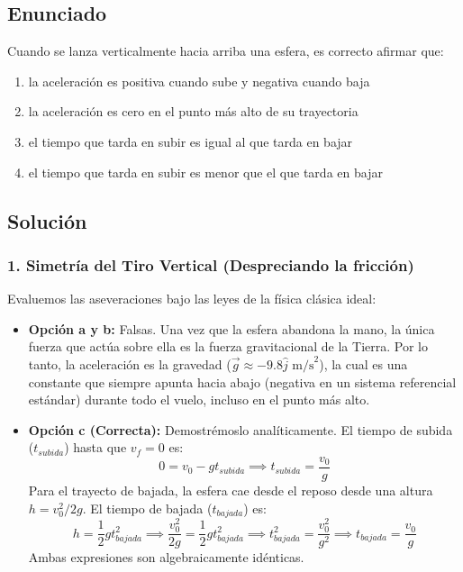 \documentclass[12pt, a4paper]{article}
\begin{document}
\subsection*{Enunciado}
Cuando se lanza verticalmente hacia arriba una esfera, es correcto afirmar que:
\begin{enumerate}[label=\alph*)]
    \item la aceleración es positiva cuando sube y negativa cuando baja
    \item la aceleración es cero en el punto más alto de su trayectoria
    \item el tiempo que tarda en subir es igual al que tarda en bajar
    \item el tiempo que tarda en subir es menor que el que tarda en bajar
\end{enumerate}

\subsection*{Solución}

\subsubsection*{1. Simetría del Tiro Vertical (Despreciando la fricción)}
Evaluemos las aseveraciones bajo las leyes de la física clásica ideal:
\begin{itemize}
    \item \textbf{Opción a y b:} Falsas. Una vez que la esfera abandona la mano, la única fuerza que actúa sobre ella es la fuerza gravitacional de la Tierra. Por lo tanto, la aceleración es la gravedad ($\vec{g} \approx -9.8\hat{j}\text{ m/s}^2$), la cual es una constante que siempre apunta hacia abajo (negativa en un sistema referencial estándar) durante todo el vuelo, incluso en el punto más alto.
    \item \textbf{Opción c (Correcta):} Demostrémoslo analíticamente. El tiempo de subida ($t_{subida}$) hasta que $v_f=0$ es: 
    $$ 0 = v_0 - g t_{subida} \implies t_{subida} = \frac{v_0}{g} $$
    Para el trayecto de bajada, la esfera cae desde el reposo desde una altura $h = v_0^2 / 2g$. El tiempo de bajada ($t_{bajada}$) es:
    $$ h = \frac{1}{2}g t_{bajada}^2 \implies \frac{v_0^2}{2g} = \frac{1}{2}g t_{bajada}^2 \implies t_{bajada}^2 = \frac{v_0^2}{g^2} \implies t_{bajada} = \frac{v_0}{g} $$
    Ambas expresiones son algebraicamente idénticas.
\end{itemize}
\end{document}

